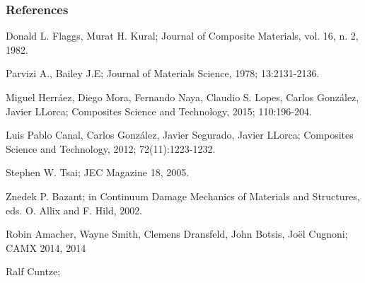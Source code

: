 \documentclass[first,firstsupp,lastsupp,handout,last,hyperref,table]{ETHclass}
\begin{document}
\begin{frame}[allowframebreaks]
  \frametitle{References}

  \begin{thebibliography}{10}

%


  \beamertemplatearticlebibitems

Donald L. Flaggs, Murat H. Kural;
\newblock Journal of Composite Materials, vol. 16, n. 2, 1982.

Parvizi A., Bailey J.E;
\newblock Journal of Materials Science, 1978; 13:2131-2136.

Miguel Herr\'aez, Diego Mora, Fernando Naya, Claudio S. Lopes, Carlos Gonz\'alez, Javier LLorca;
\newblock Composites Science and Technology, 2015; 110:196-204.

Luis Pablo Canal, Carlos Gonz\'alez, Javier Segurado, Javier LLorca;
\newblock Composites Science and Technology, 2012; 72(11):1223-1232.

Stephen W. Tsai;
\newblock JEC Magazine 18, 2005.


Znedek P. Bazant;
\newblock in Continuum Damage Mechanics of Materials and Structures, eds. O. Allix and F. Hild, 2002.


Robin Amacher, Wayne Smith, Clemens Dransfeld, John Botsis, Jo\"el Cugnoni;
\newblock CAMX 2014, 2014

Ralf Cuntze;



\end{thebibliography}
\end{frame}
\end{document}
